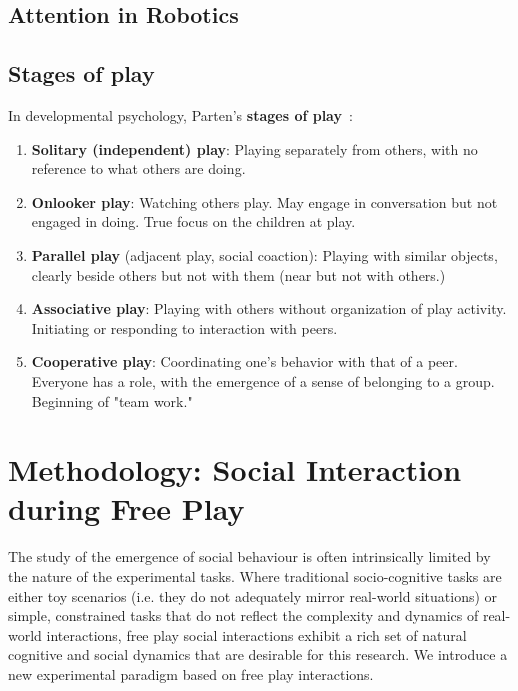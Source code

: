 \documentclass[a4paper]{article}
\newcommand{\ie}{i.e.\xspace}
\begin{document}
\subsection{Attention in Robotics}

\subsection{Stages of play}

In developmental psychology, Parten's {\bf stages of
play}~\cite{parten1932social}:

\begin{enumerate}
    \item {\bf Solitary (independent) play}: Playing separately from
        others, with no reference to what others are doing.
    \item {\bf Onlooker play}: Watching others play. May engage in
        conversation but not engaged in doing. True focus on the children at
        play.
    \item {\bf Parallel play} (adjacent play, social coaction): Playing
        with similar objects, clearly beside others but not with them (near
        but not with others.)
    \item {\bf Associative play}:  Playing with others without
        organization of play activity. Initiating or responding to
        interaction with peers. 
    \item {\bf Cooperative play}: Coordinating one’s behavior with that
        of a peer. Everyone has a role, with the emergence of a sense of
        belonging to a group. Beginning of "team work."
\end{enumerate}



\section{Methodology: Social Interaction during Free Play}


The study of the emergence of social behaviour is often intrinsically limited by
the nature of the experimental tasks. Where traditional
socio-cognitive tasks are either toy scenarios (\ie they do not adequately
mirror real-world situations) or simple, constrained tasks that do not reflect
the complexity and dynamics of real-world interactions, free play social
interactions exhibit a rich set of natural cognitive and social dynamics that
are desirable for this research. We introduce a new
experimental paradigm based on free play interactions. 
\end{document}
